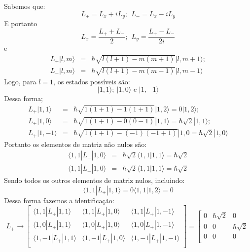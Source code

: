 \begin{enumerate}[start=1,label={\bfseries Q\arabic*.}]
\resposta Sabemos que:
$$
  L_{+} = L_{x} + i L_{y}; \ \ L_{-} = L_{x} - i L_{y}
$$
E portanto
$$
  L_{x} = \frac{L_{+} + L_{-}}{2}; \ \ L_{y} = \frac{L_{+} - L_{-}}{2i}
$$
e
$$
\begin{array}{ccc}
L_{+}|l,m \rangle & = & \hbar \sqrt{l (l+1) - m(m+1)} | l, m+1 \rangle ; \\
L_{-}|l,m \rangle & = & \hbar \sqrt{l (l+1) - m(m-1)} | l, m-1 \rangle
\end{array}
$$
Logo, para $l=1$, os estados possíveis são:
$$
|1,1\rangle; \ |1,0\rangle \mbox{ e } |1,-1\rangle
$$
Dessa forma;
$$
\begin{array}{ccl}
L_{+}|1,1 \rangle & = & \hbar \sqrt{1 (1+1) - 1(1+1)} | 1, 2 \rangle = 0 | 1, 2 \rangle ; \\
L_{+}|1,0 \rangle & = & \hbar \sqrt{1 (1+1) - 0(0-1)} | 1, 1 \rangle = \hbar \sqrt{2} | 1, 1 \rangle ; \\
L_{+}|1,-1 \rangle & = & \hbar \sqrt{1 (1+1) - (-1)(-1+1)} | 1, 0 = \hbar \sqrt{2} | 1, 0 \rangle
\end{array}
$$
Portanto os elementos de matriz não nulos são:
$$
\begin{array}{ccc}
 \langle 1, 1 | L_{+} | 1, 0 \rangle & = & \hbar \sqrt{2} \langle 1, 1 | 1, 1 \rangle = \hbar \sqrt{2} \\
 \langle 1, 1 | L_{+} | 1, 0 \rangle & = & \hbar \sqrt{2} \langle 1, 1 | 1, 1 \rangle = \hbar \sqrt{2}
\end{array}
$$
Sendo todos os outros elementos de matriz nulos, incluindo:
$$
 \langle 1, 1 | L_{+} | 1, 1 \rangle = 0 \langle 1, 1 | 1, 2 \rangle = 0
$$
Dessa forma fazemos a identificação:
$$
L_{+} \rightarrow \left[
  \begin{array}{ccc}
  \langle 1, 1 | L_{+} | 1, 1 \rangle & \langle 1, 1 | L_{+} | 1, 0 \rangle & \langle 1, 1 | L_{+} | 1, -1 \rangle \\
  \langle 1, 0 | L_{+} | 1, 1 \rangle & \langle 1, 0 | L_{+} | 1, 0 \rangle & \langle 1, 0 | L_{+} | 1, -1 \rangle \\
  \langle 1,-1 | L_{+} | 1,1 \rangle & \langle 1,-1 | L_{+} | 1,0 \rangle & \langle 1,-1 | L_{+} | 1,-1 \rangle \\
  \end{array}
\right] =
\left[
  \begin{array}{ccc}
  0 & \hbar \sqrt{2} & 0 \\
  0 & 0 & \hbar \sqrt{2} \\
  0 & 0 & 0 \\
  \end{array}
$$
\end{enumerate}

